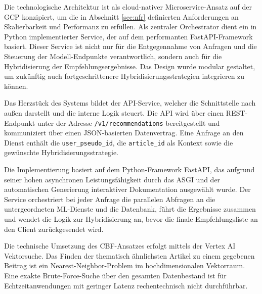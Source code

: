
Die technologische Architektur ist als cloud-nativer Microservice-Ansatz auf der \ac{GCP} konzipiert,
um die in Abschnitt \ref{sec:nfr} definierten Anforderungen an Skalierbarkeit und Performanz zu erfüllen. 
Als zentraler Orchestrator dient ein in Python implementierter Service, der auf dem performanten FastAPI-Framework basiert. 
Dieser Service ist nicht nur für die Entgegennahme von Anfragen und die Steuerung der Modell-Endpunkte verantwortlich, 
sondern auch für die Hybridisierung der Empfehlungsergebnisse. Das Design wurde modular gestaltet, 
um zukünftig auch fortgeschrittenere Hybridisierungsstrategien integrieren zu können.

\label{sec:api_design}

Das Herzstück des Systems bildet der API-Service, welcher die Schnittstelle nach außen darstellt und die interne Logik steuert. 
Die API wird über einen REST-Endpunkt unter der Adresse \texttt{/v1/recommendations} bereitgestellt und kommuniziert über einen 
JSON-basierten Datenvertrag. Eine Anfrage an den Dienst enthält die \texttt{user\_pseudo\_id}, die \texttt{article\_id} 
als Kontext sowie die gewünschte Hybridisierungsstrategie. 

Die Implementierung basiert auf dem Python-Framework FastAPI, das aufgrund seiner hohen asynchronen Leistungsfähigkeit durch das \ac{ASGI} und 
der automatischen Generierung interaktiver Dokumentation ausgewählt wurde. Der Service orchestriert bei 
jeder Anfrage die parallelen Abfragen an die untergeordneten ML-Dienste und die Datenbank, führt die Ergebnisse zusammen 
und wendet die Logik zur Hybridisierung an, bevor die finale Empfehlungsliste an den Client zurückgesendet wird.

\label{sec:cbf_service}

Die technische Umsetzung des \ac{CBF}-Ansatzes erfolgt mittels der Vertex AI Vektorsuche. 
Das Finden der thematisch ähnlichsten Artikel zu einem gegebenen Beitrag ist ein Nearest-Neighbor-Problem
im hochdimensionalen Vektorraum. 
Eine exakte Brute-Force-Suche über den gesamten Datenbestand ist für Echtzeitanwendungen mit geringer Latenz rechentechnisch nicht durchführbar.

